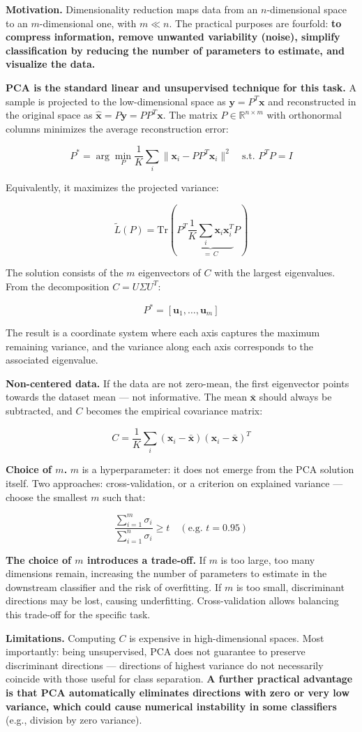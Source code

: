 \textbf{Motivation.} Dimensionality reduction maps data from an $n$-dimensional space to an $m$-dimensional one, with $m \ll n$. The practical purposes are fourfold: \textbf{to compress information, remove unwanted variability (noise), simplify classification by reducing the number of parameters to estimate, and visualize the data.}

\textbf{PCA is the standard linear and unsupervised technique for this task.} A sample is projected to the low-dimensional space as $\mathbf{y} = P^T\mathbf{x}$ and reconstructed in the original space as $\hat{\mathbf{x}} = P\mathbf{y} = PP^T\mathbf{x}$. The matrix $P \in \mathbb{R}^{n \times m}$ with orthonormal columns minimizes the average reconstruction error:

$$P^* = \arg\min_P \frac{1}{K}\sum_i \|\mathbf{x}_i - PP^T\mathbf{x}_i\|^2 \quad \text{s.t. } P^TP = I$$

Equivalently, it maximizes the projected variance:

$$\widetilde{L}(P) = \text{Tr}\!\left(P^T \underbrace{\frac{1}{K}\sum_i \mathbf{x}_i\mathbf{x}_i^T}_{=\,C} P\right)$$

The solution consists of the $m$ eigenvectors of $C$ with the largest eigenvalues. From the decomposition $C = U\Sigma U^T$:

$$P^* = [\mathbf{u}_1, \ldots, \mathbf{u}_m]$$

The result is a coordinate system where each axis captures the maximum remaining variance, and the variance along each axis corresponds to the associated eigenvalue.

\textbf{Non-centered data.} If the data are not zero-mean, the first eigenvector points towards the dataset mean — not informative. The mean $\bar{\mathbf{x}}$ should always be subtracted, and $C$ becomes the empirical covariance matrix:

$$C = \frac{1}{K}\sum_i (\mathbf{x}_i - \bar{\mathbf{x}})(\mathbf{x}_i - \bar{\mathbf{x}})^T$$

\textbf{Choice of $m$.} $m$ is a hyperparameter: it does not emerge from the PCA solution itself. Two approaches: cross-validation, or a criterion on explained variance — choose the smallest $m$ such that:

$$\frac{\sum_{i=1}^{m} \sigma_i}{\sum_{i=1}^{n} \sigma_i} \geq t \quad (\text{e.g. } t = 0.95)$$

\textbf{The choice of $m$ introduces a trade-off.} If $m$ is too large, too many dimensions remain, increasing the number of parameters to estimate in the downstream classifier and the risk of overfitting. If $m$ is too small, discriminant directions may be lost, causing underfitting. Cross-validation allows balancing this trade-off for the specific task.

\textbf{Limitations.} Computing $C$ is expensive in high-dimensional spaces. Most importantly: being unsupervised, PCA does not guarantee to preserve discriminant directions — directions of highest variance do not necessarily coincide with those useful for class separation. \textbf{A further practical advantage is that PCA automatically eliminates directions with zero or very low variance, which could cause numerical instability in some classifiers} (e.g., division by zero variance).
